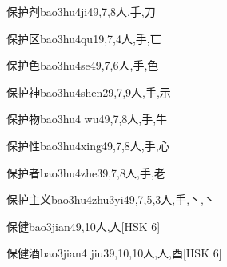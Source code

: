 \begin{EntryWithPhonetic}{保护剂}{bao3hu4ji4}{9,7,8}{⼈,⼿,⼑}
\end{EntryWithPhonetic}

\begin{EntryWithPhonetic}{保护区}{bao3hu4qu1}{9,7,4}{⼈,⼿,⼖}
\end{EntryWithPhonetic}

\begin{EntryWithPhonetic}{保护色}{bao3hu4se4}{9,7,6}{⼈,⼿,⾊}
\end{EntryWithPhonetic}

\begin{EntryWithPhonetic}{保护神}{bao3hu4shen2}{9,7,9}{⼈,⼿,⽰}
\end{EntryWithPhonetic}

\begin{EntryWithPhonetic}{保护物}{bao3hu4 wu4}{9,7,8}{⼈,⼿,⽜}
\end{EntryWithPhonetic}

\begin{EntryWithPhonetic}{保护性}{bao3hu4xing4}{9,7,8}{⼈,⼿,⼼}
\end{EntryWithPhonetic}

\begin{EntryWithPhonetic}{保护者}{bao3hu4zhe3}{9,7,8}{⼈,⼿,⽼}
\end{EntryWithPhonetic}

\begin{EntryWithPhonetic}{保护主义}{bao3hu4zhu3yi4}{9,7,5,3}{⼈,⼿,⼂,⼂}
\end{EntryWithPhonetic}

\begin{EntryWithPhonetic}{保健}{bao3jian4}{9,10}{⼈,⼈}[HSK 6]
\end{EntryWithPhonetic}

\begin{EntryWithPhonetic}{保健酒}{bao3jian4 jiu3}{9,10,10}{⼈,⼈,⾣}[HSK 6]
\end{EntryWithPhonetic}

